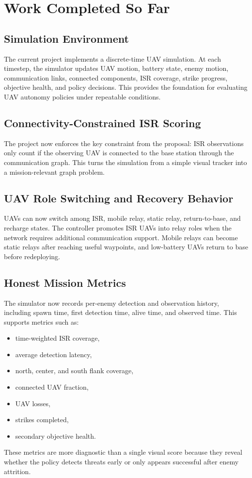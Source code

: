 \documentclass[conference]{IEEEtran}
\begin{document}
\section{Work Completed So Far}

\subsection{Simulation Environment}
The current project implements a discrete-time UAV simulation. At each timestep,
the simulator updates UAV motion, battery state, enemy motion, communication
links, connected components, ISR coverage, strike progress, objective health,
and policy decisions. This provides the foundation for evaluating UAV autonomy
policies under repeatable conditions.

\subsection{Connectivity-Constrained ISR Scoring}
The project now enforces the key constraint from the proposal: ISR observations
only count if the observing UAV is connected to the base station through the
communication graph. This turns the simulation from a simple visual tracker into
a mission-relevant graph problem.

\subsection{UAV Role Switching and Recovery Behavior}
UAVs can now switch among ISR, mobile relay, static relay, return-to-base, and
recharge states. The controller promotes ISR UAVs into relay roles when the
network requires additional communication support. Mobile relays can become
static relays after reaching useful waypoints, and low-battery UAVs return to
base before redeploying.

\subsection{Honest Mission Metrics}
The simulator now records per-enemy detection and observation history, including
spawn time, first detection time, alive time, and observed time. This supports
metrics such as:
\begin{itemize}
    \item time-weighted ISR coverage,
    \item average detection latency,
    \item north, center, and south flank coverage,
    \item connected UAV fraction,
    \item UAV losses,
    \item strikes completed,
    \item secondary objective health.
\end{itemize}
These metrics are more diagnostic than a single visual score because they reveal
whether the policy detects threats early or only appears successful after enemy
attrition.
\end{document}
